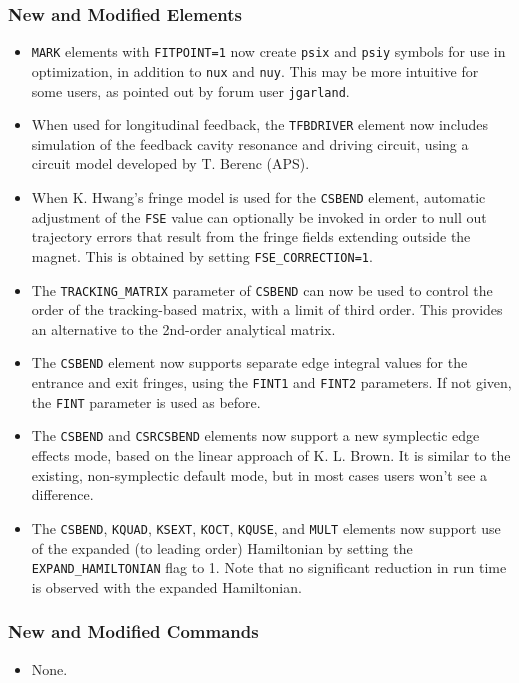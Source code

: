 \documentclass[11pt]{article}
\begin{document}
\subsubsection{New and Modified Elements}
\begin{itemize}
\item \verb|MARK| elements with \verb|FITPOINT=1| now create \verb|psix| and \verb|psiy| symbols for use in
  optimization, in addition to \verb|nux| and \verb|nuy|. This may be more intuitive for some users, as pointed
  out by forum user \verb|jgarland|.
\item When used for longitudinal feedback, the \verb|TFBDRIVER| element now includes simulation of the 
  feedback cavity resonance and driving circuit, using a circuit model developed by T. Berenc (APS).
\item When K. Hwang's fringe model is used for the \verb|CSBEND| element, automatic adjustment of the \verb|FSE|
  value can optionally be invoked in order to null out trajectory errors that result from the fringe fields extending outside
  the magnet. This is obtained by setting \verb|FSE_CORRECTION=1|.
\item The \verb|TRACKING_MATRIX| parameter of \verb|CSBEND| can now be used to control the order of the tracking-based
  matrix, with a limit of third order. This provides an alternative to the 2nd-order analytical matrix.
\item The \verb|CSBEND| element now supports separate edge integral values for the entrance and exit fringes, using the
  \verb|FINT1| and \verb|FINT2| parameters. If not given, the \verb|FINT| parameter is used as before.
\item The \verb|CSBEND| and \verb|CSRCSBEND| elements now support a new symplectic edge effects mode, based on 
  the linear approach of K. L. Brown. It is similar to the existing, non-symplectic default mode, but in most cases
  users won't see a difference.
\item The \verb|CSBEND|, \verb|KQUAD|, \verb|KSEXT|, \verb|KOCT|, \verb|KQUSE|, and \verb|MULT| elements now support use
  of the expanded (to leading order) Hamiltonian by setting the \verb|EXPAND_HAMILTONIAN| flag to 1. Note that no significant
  reduction in run time is observed with the expanded Hamiltonian.
\end{itemize}

\subsubsection{New and Modified Commands}
\begin{itemize}
\item None.
\end{itemize}
\end{document}
